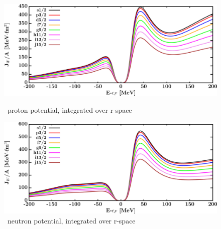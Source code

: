 \begin{figure}[H]
    \centering
    \begin{minipage}{0.45\textwidth}
        \centering
        \includegraphics[width=1.0\textwidth]{figures/ca48_protonVolumeIntegrals.png}
        \caption{\caEight\ proton potential, integrated over r-space}
        \label{DOMFitData_ca48_proton_potentialIntegral}
    \end{minipage}\hfill
    \begin{minipage}{0.45\textwidth}
        \centering
        \includegraphics[width=1.0\textwidth]{figures/ca48_neutronVolumeIntegrals.png}
        \caption{\caEight\ neutron potential, integrated over r-space}
        \label{DOMFitData_ca48_neutron_potentialIntegral}
    \end{minipage}
\end{figure}

\afterpage{\clearpage}

